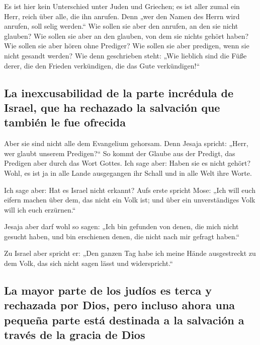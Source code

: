  Es ist hier kein Unterschied unter Juden und Griechen;
es ist aller zumal ein Herr, reich über alle, die ihn anrufen.
 Denn „wer den Namen des Herrn wird anrufen, soll selig
werden.``  Wie sollen sie aber den anrufen, an den sie
nicht glauben? Wie sollen sie aber an den glauben, von dem sie nichts
gehört haben? Wie sollen sie aber hören ohne Prediger? 
Wie sollen sie aber predigen, wenn sie nicht gesandt werden? Wie denn
geschrieben steht: „Wie lieblich sind die Füße derer, die den Frieden
verkündigen, die das Gute verkündigen!{}``

\hypertarget{la-inexcusabilidad-de-la-parte-incruxe9dula-de-israel-que-ha-rechazado-la-salvaciuxf3n-que-tambiuxe9n-le-fue-ofrecida}{%
\subsection{La inexcusabilidad de la parte incrédula de Israel, que ha
rechazado la salvación que también le fue
ofrecida}\label{la-inexcusabilidad-de-la-parte-incruxe9dula-de-israel-que-ha-rechazado-la-salvaciuxf3n-que-tambiuxe9n-le-fue-ofrecida}}

 Aber sie sind nicht alle dem Evangelium gehorsam. Denn
Jesaja spricht: „Herr, wer glaubt unserem Predigen?{}`` 
So kommt der Glaube aus der Predigt, das Predigen aber durch das Wort
Gottes.  Ich sage aber: Haben sie es nicht gehört? Wohl,
es ist ja in alle Lande ausgegangen ihr Schall und in alle Welt ihre
Worte.

 Ich sage aber: Hat es Israel nicht erkannt? Aufs erste
spricht Mose: „Ich will euch eifern machen über dem, das nicht ein Volk
ist; und über ein unverständiges Volk will ich euch erzürnen.``

 Jesaja aber darf wohl so sagen: „Ich bin gefunden von
denen, die mich nicht gesucht haben, und bin erschienen denen, die nicht
nach mir gefragt haben.``

 Zu Israel aber spricht er: „Den ganzen Tag habe ich
meine Hände ausgestreckt zu dem Volk, das sich nicht sagen lässt und
widerspricht.``

\hypertarget{la-mayor-parte-de-los-juduxedos-es-terca-y-rechazada-por-dios-pero-incluso-ahora-una-pequeuxf1a-parte-estuxe1-destinada-a-la-salvaciuxf3n-a-travuxe9s-de-la-gracia-de-dios}{%
\subsection{La mayor parte de los judíos es terca y rechazada por Dios,
pero incluso ahora una pequeña parte está destinada a la salvación a
través de la gracia de
Dios}\label{la-mayor-parte-de-los-juduxedos-es-terca-y-rechazada-por-dios-pero-incluso-ahora-una-pequeuxf1a-parte-estuxe1-destinada-a-la-salvaciuxf3n-a-travuxe9s-de-la-gracia-de-dios}}

